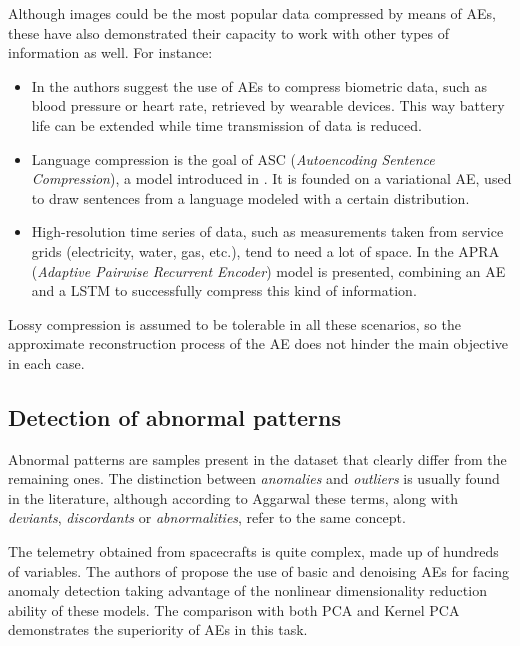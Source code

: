 \documentclass[preprint,5p,compress]{elsarticle}
\begin{document}
Although images could be the most popular data compressed by means of AEs, these have also demonstrated their capacity to work with other types of information as well. For instance:
\begin{itemize}
    \item In  \cite{AEBioCompress} the authors suggest the use of AEs to compress biometric data, such as blood pressure or heart rate, retrieved by wearable devices. This way  battery life can be extended while time transmission of data is reduced. 
    
    \item Language compression is the goal of ASC (\textit{Autoencoding Sentence Compression}), a model introduced in \cite{VAESentenceCompress}. It is founded on a variational AE, used to draw sentences from a language modeled with a certain distribution.
    
    \item High-resolution time series of data, such as measurements taken from service grids (electricity, water, gas, etc.), tend to need a lot of space. In \cite{RAETSCompress} the APRA (\textit{Adaptive Pairwise Recurrent Encoder}) model is presented, combining an AE and a LSTM to successfully compress this kind of information.
\end{itemize}

Lossy compression is assumed to be tolerable in all these scenarios, so the approximate reconstruction process of the AE does not hinder the main objective in each case.

\subsection{Detection of abnormal patterns}
Abnormal patterns are samples present in the dataset that clearly differ from the remaining ones. The distinction between \textit{anomalies} and \textit{outliers} is usually found in the literature, although according to Aggarwal \cite{OutlierAnalysis} these terms, along with \textit{deviants}, \textit{discordants} or \textit{abnormalities}, refer to the same concept.

The telemetry obtained from spacecrafts is quite complex, made up of hundreds of variables. The authors of \cite{sakurada_anomaly_2014} propose the use of basic and denoising AEs for facing anomaly detection taking advantage of the nonlinear dimensionality reduction ability of these models. The comparison with both PCA and Kernel PCA demonstrates the superiority of AEs in this task.
\end{document}
